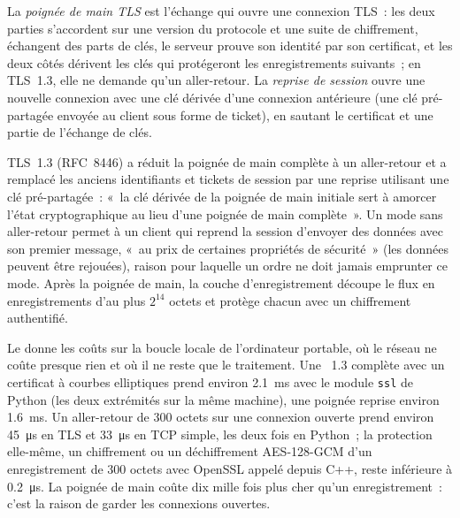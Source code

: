 \begin{definition}\label{def:ll:websocket-rest-tls-and-json-at-speed:tls}
La \emph{poignée de main TLS} est l'échange qui ouvre une connexion TLS~: les deux parties s'accordent sur une version du protocole
et une suite de chiffrement, échangent des parts de clés, le serveur prouve son identité par son certificat, et les deux côtés dérivent les clés qui
protégeront les enregistrements suivants~; en TLS~1.3, elle ne demande qu'un aller-retour. La \emph{reprise de session}
ouvre une nouvelle connexion avec une clé dérivée d'une connexion antérieure (une clé pré-partagée envoyée au client sous forme de ticket), en sautant
le certificat et une partie de l'échange de clés.
\end{definition}

TLS~1.3 (RFC~8446) a réduit la poignée de main complète à un aller-retour et a remplacé les anciens identifiants et tickets de session par
une reprise utilisant une clé pré-partagée~: «~la clé dérivée de la poignée de main initiale sert à amorcer l'état cryptographique
au lieu d'une poignée de main complète~». Un mode sans aller-retour permet à un client qui reprend la session d'envoyer des données avec son premier message, «~au
prix de certaines propriétés de sécurité~» (les données peuvent être rejouées), raison pour laquelle un ordre ne doit jamais emprunter ce mode. Après la poignée de main,
la couche d'enregistrement découpe le flux en enregistrements d'au plus $2^{14}$ octets et protège chacun
avec un chiffrement authentifié.

Le  donne les coûts sur la boucle locale de l'ordinateur portable, où le réseau ne coûte
presque rien et où il ne reste que le traitement. Une ~1.3 complète avec un certificat à courbes elliptiques prend environ
\qty{2.1}{\milli\second} avec le module \texttt{ssl} de Python (les deux extrémités sur la même machine), une poignée reprise environ
\qty{1.6}{\milli\second}. Un aller-retour de 300 octets sur une connexion ouverte prend environ \qty{45}{\micro\second} en TLS et
\qty{33}{\micro\second} en TCP simple, les deux fois en Python~; la protection elle-même, un chiffrement ou un déchiffrement AES-128-GCM d'un enregistrement de 300 octets
avec OpenSSL appelé depuis C++, reste inférieure à \qty{0.2}{\micro\second}. La poignée de main coûte dix mille fois plus cher qu'un enregistrement~:
c'est la raison de garder les connexions ouvertes.

